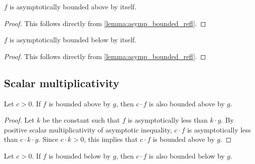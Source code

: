 \begin{lemma}
    \label{lemma:asymp_bounded_above_refl}
    \leanok
    $f$ is asymptotically bounded above by itself.
\end{lemma}

\begin{proof}
    \leanok
    This follows directly from \ref{lemma:asymp_bounded_refl}.
\end{proof}

\begin{lemma}
    \label{lemma:asymp_bounded_below_refl}
    \leanok
    $f$ is asymptotically bounded below by itself.
\end{lemma}

\begin{proof}
    \leanok
    This follows directly from \ref{lemma:asymp_bounded_refl}.
\end{proof}


\subsection{Scalar multiplicativity}

\begin{lemma}
    \label{lemma:asymp_bounded_above_pos_smul}
    \leanok
    Let $c > 0$. If $f$ is bounded above by $g$, then $c \cdot f$ is also bounded
    above by $g$.
\end{lemma}

\begin{proof}
    \leanok
    Let $k$ be the constant such that $f$ is asymptotically less than $k \cdot g$.
    By positive scalar multiplicativity of asymptotic inequality, $c \cdot f$ is 
    asymptotically less than $c \cdot k \cdot g$. Since $c \cdot k > 0$, this implies 
    that $c \cdot f$ is bounded above by $g$.
\end{proof}

\begin{lemma}
    \label{lemma:asymp_bounded_below_pos_smul}
    \leanok
    Let $c > 0$. If $f$ is bounded below by $g$, then $c \cdot f$ is also bounded
    below by $g$.
\end{lemma}

